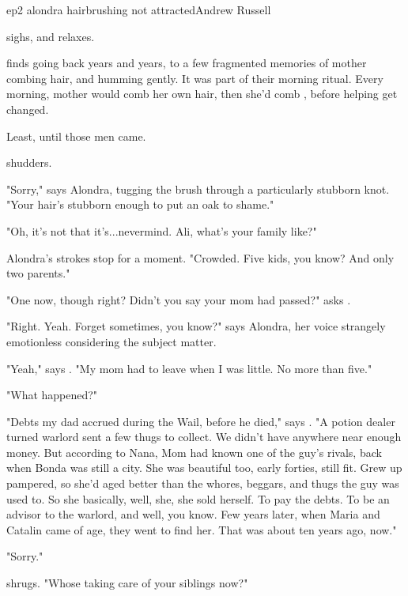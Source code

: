 \documentclass{book}
\begin{document}
\begin{childnode}{ep2 alondra hairbrushing not attracted}{Andrew Russell}

    \name{} sighs, and relaxes. 

    \name{} finds \himselfherself{} going back years and years, to a few fragmented memories of \hisher{} mother combing \hisher{} hair, and humming gently. It was part of their morning ritual. 
    Every morning, mother would comb her own hair, then she'd comb \names{}, before helping \himher{} get changed.

    Least, until those men came.

    \name{} shudders.

    "Sorry," says Alondra, tugging the brush through a particularly stubborn knot. "Your hair's stubborn enough to put an oak to shame."

    "Oh, it's not that it's...nevermind. Ali, what's your family like?" 

    Alondra's strokes stop for a moment. "Crowded. Five kids, you know? And only two parents."

    "One now, though right? Didn't you say your mom had passed?" asks \name{}.

    "Right. Yeah. Forget sometimes, you know?" says Alondra, her voice strangely emotionless considering the subject matter.

    "Yeah," says \name{}. "My mom had to leave when I was little. No more than five."

    "What happened?"

    "Debts my dad accrued during the Wail, before he died," says \name{}. "A potion dealer turned warlord sent a few thugs to collect. We didn't have anywhere near enough money. But according to Nana, Mom had known one of the guy's rivals, back when Bonda was still a 
    city. She
    was beautiful too, early forties, still fit. Grew up pampered, so she'd aged better than the whores, beggars, and thugs the guy was used to. So she basically, well, she, she sold herself. To pay
    the debts. To be an advisor to the warlord, and well, you know. Few years later, when Maria and Catalin came of age, they went to find her. That was about ten years ago, now."

    "Sorry."

    \name{} shrugs. "Whose taking care of your siblings now?"


\end{childnode}
\end{document}
